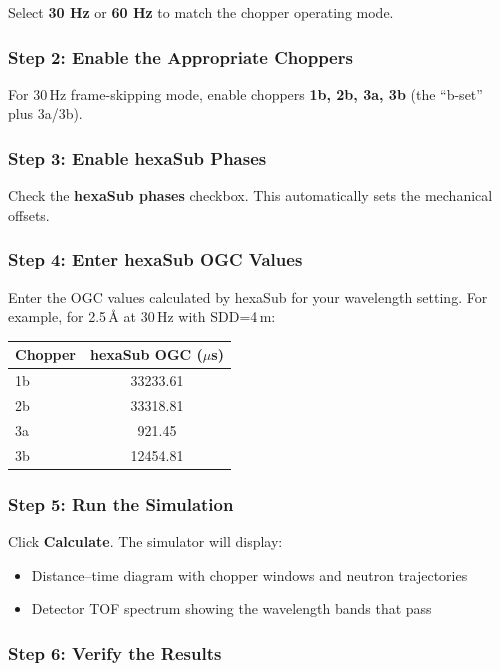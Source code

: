 \documentclass[tm]{ornltm}
\begin{document}
Select \textbf{30 Hz} or \textbf{60 Hz} to match the chopper operating mode.

\subsubsection{Step 2: Enable the Appropriate Choppers}

For 30\,Hz frame-skipping mode, enable choppers \textbf{1b, 2b, 3a, 3b} (the ``b-set'' plus 3a/3b).

\subsubsection{Step 3: Enable hexaSub Phases}

Check the \textbf{hexaSub phases} checkbox. This automatically sets the mechanical offsets.

\subsubsection{Step 4: Enter hexaSub OGC Values}

Enter the OGC values calculated by hexaSub for your wavelength setting. For example, for 2.5\,\AA{} at 30\,Hz with SDD=4\,m:

\begin{table}[ht]
\centering
\begin{tabular}{lc}
\toprule
Chopper & hexaSub OGC ($\mu$s) \\
\midrule
1b & 33233.61 \\
2b & 33318.81 \\
3a & 921.45 \\
3b & 12454.81 \\
\bottomrule
\end{tabular}
\end{table}

\subsubsection{Step 5: Run the Simulation}

Click \textbf{Calculate}. The simulator will display:
\begin{itemize}
    \item Distance--time diagram with chopper windows and neutron trajectories
    \item Detector TOF spectrum showing the wavelength bands that pass
\end{itemize}

\subsubsection{Step 6: Verify the Results}
\end{document}
